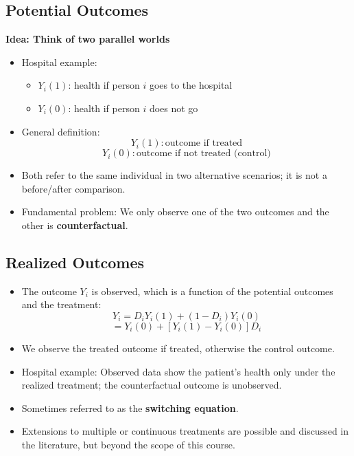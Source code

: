 \documentclass[11pt,aspectratio=169]{beamer}
\begin{document}
\begin{frame}

\subsection*{Potential Outcomes}

\textbf{Idea: Think of two parallel worlds}
\begin{itemize}
    \item Hospital example:
    \begin{itemize}
        \item[\blacksquare] $Y_i(1)$: health if person $i$ goes to the hospital
        \item[\blacksquare] $Y_i(0)$: health if person $i$ does not go
    \end{itemize}
    \item General definition:
    $$Y_i(1) : \text{outcome if treated}$$
    $$Y_i(0) : \text{outcome if not treated (control)}$$
    \item Both refer to the same individual in two alternative scenarios; it is not a before/after comparison.
    \item Fundamental problem: We only observe one of the two outcomes and the other is \textbf{counterfactual}.
\end{itemize}

\end{frame}
\begin{frame}

\subsection*{Realized Outcomes}

\begin{itemize}
    \item The outcome $Y_i$ is observed, which is a function of the potential outcomes and the treatment:
    $$Y_i = D_iY_i(1) + (1 - D_i)Y_i(0)$$
    $$= Y_i(0) + [Y_i(1) - Y_i(0)]D_i$$
    \item We observe the treated outcome if treated, otherwise the control outcome.
    \item Hospital example: Observed data show the patient's health only under the realized treatment; the counterfactual outcome is unobserved.
    \item Sometimes referred to as the \textbf{switching equation}.
    \item Extensions to multiple or continuous treatments are possible and discussed in the literature, but beyond the scope of this course.
\end{itemize}

\end{frame}
\end{document}
